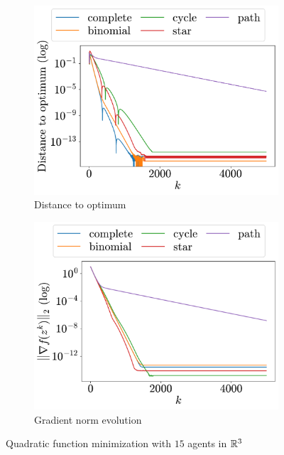 \documentclass[a4paper,11pt,oneside]{book}
\begin{document}
\begin{figure}[H]
      \centering
      \begin{subfigure}[t]{0.48\linewidth}
            \centering
            \includegraphics[width=\linewidth]{./figs/quadratic/15_3/distance.pdf} 
            \caption{Distance to optimum}
      \end{subfigure}
      \hfill
      \begin{subfigure}[t]{0.48\linewidth}
            \centering
            \includegraphics[width=\linewidth]{./figs/quadratic/15_3/gradient.pdf} 
            \caption{Gradient norm evolution}
      \end{subfigure}
      \caption{Quadratic function minimization with $15$ agents in ${\mathbb{R}}^{3}$}
      \label{fig:quadratic_15_3}
\end{figure}
\end{document}
